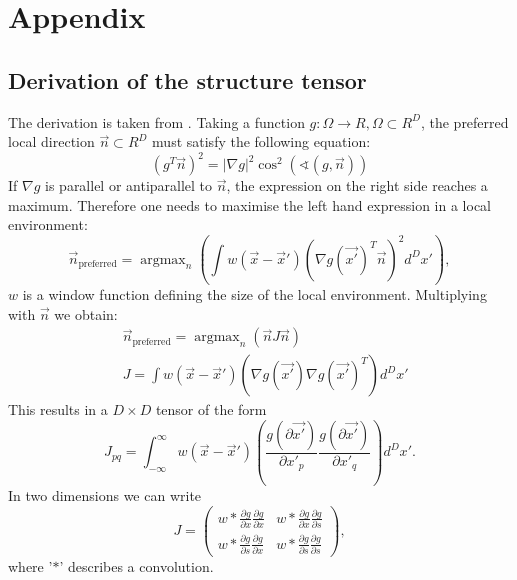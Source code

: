 \documentclass  [
  paper    = a4,
  BCOR     = 10mm,
  twoside,
  fontsize = 12pt,
  fleqn,
  toc      = bibnumbered,
  toc      = listofnumbered,
  numbers  = noendperiod,
  headings = normal,
  listof   = leveldown,
  version  = 3.03
]                                       {scrreprt}
\DeclareMathOperator*{\argmax}{argmax}
\begin{document}
  \part*{Appendix}
  \begin{appendix}
  	\chapter{Derivation of the structure tensor}
  	The derivation is taken from \cite{jahne2013digitale}. Taking a function $g:\Omega\rightarrow \!R, \Omega \subset \!R^D$, the preferred local direction $\vec{n} \subset \!R^D$ must satisfy the following equation:
  	\begin{equation}\label{key}
  	( g^T\vec{n})^2 = |\nabla g |^2 \cos^2(\sphericalangle (g, \vec{n}))
  	\end{equation}
  	If $\nabla g$ is parallel or antiparallel to $\vec{n}$, the expression on the right side reaches a maximum. Therefore one needs to maximise the left hand expression in a local environment:
  	\begin{equation}\label{key}
  	\vec n_\text{preferred} = \argmax_n\left(\int w(\vec x - \vec x')\left(\nabla g(\vec{x'})^T \vec{n}\right)^2d^Dx' \right),
  	\end{equation}
  	$w$ is a window function defining the size of the local environment. Multiplying with $\vec{n}$
  	we obtain:
  	\begin{align}\label{key}
  	&\vec n_\text{preferred} = \argmax_n\left(\vec n  J \vec n \right)\\
  	& J = \int w(\vec x - \vec x')\left(\nabla g(\vec{x'}) \nabla g(\vec{x'})^T\right)d^Dx'
  	\end{align}
  	This results in a $D\times D $ tensor of the form
  	\begin{equation}\label{key}
  	J_{pq} = \int_{-\infty}^{\infty} w(\vec x - \vec x')\left(\frac{g(\partial\vec{x'})}{\partial x'_p} \frac{g(\partial\vec{x'})}{\partial x'_q}\right)d^Dx'.
  	\end{equation}
  	In two dimensions we can write
	\begin{equation}\label{key}
	J =\left(
	\begin{matrix}
	w*\frac{\partial g}{\partial x}\frac{\partial g}{\partial x} & w*\frac{\partial g}{\partial x}\frac{\partial g}{\partial s} \\
	w*\frac{\partial g}{\partial s}\frac{\partial g}{\partial x} & w*\frac{\partial g}{\partial s}\frac{\partial g}{\partial s} 
	\end{matrix}\right),
	\end{equation}  
	where '$*$' describes a convolution.	
  	

\end{appendix}
\end{document}
